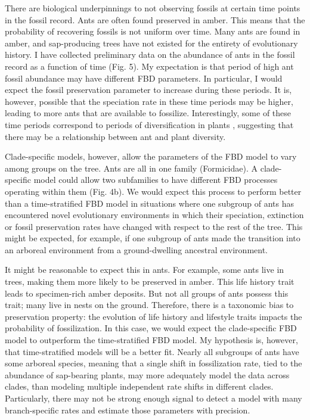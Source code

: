 \documentclass[12pt]{article}
\begin{document}
There are biological underpinnings to not observing fossils at certain time points in the fossil record.
Ants are often found preserved in amber. 
This means  that the probability of recovering fossils is not uniform over time.
Many ants are found in amber, and sap-producing trees have not existed for the entirety of evolutionary history.
I have collected preliminary data on the abundance of ants in the fossil record as a function of time (Fig. 5). 
My expectation is that period of high ant fossil abundance may have different FBD parameters.
In particular, I would expect the fossil preservation parameter to increase during these periods.
It is, however, possible that the speciation rate in these time periods may be higher, leading to more ants that are available to fossilize.
Interestingly, some of these time periods correspond to periods of diversification in plants \cite{magallon2009}, suggesting that there may be a relationship between ant and plant diversity. 
\par
Clade-specific models, however, allow the parameters of the FBD model to vary among groups on the tree.
Ants are all in one family (Formicidae).
A clade-specific model could allow two subfamilies to have different FBD processes operating within them (Fig. 4b). 
We would expect this process to perform better than a time-stratified FBD model in situations where one subgroup of ants has encountered novel evolutionary environments in which their speciation, extinction or fossil preservation rates have changed with respect to the rest of the tree.
This might be expected, for example, if one subgroup of ants made the transition into an arboreal environment from a ground-dwelling ancestral environment. \par
It might be reasonable to expect this in ants. 
For example, some ants live in trees, making them more likely to be preserved in amber.
This life history trait leads to specimen-rich amber deposits.
But not all groups of ants possess this trait; many live in nests on the ground.
Therefore, there is a taxonomic bias to preservation property: the evolution of life history and lifestyle traits impacts the probability of fossilization.
In this case, we would expect the clade-specific FBD model to outperform the time-stratified FBD model.
My hypothesis is, however, that time-stratified models will be a better fit.
Nearly all subgroups of ants have some arboreal species, meaning that a single shift in fossilization rate, tied to the abundance of sap-bearing plants, may more adequately model the data across clades, than modeling multiple independent rate shifts in different clades. 
Particularly, there may not be strong enough signal to detect a model with many branch-specific rates and estimate those parameters with precision. \par
\end{document}
